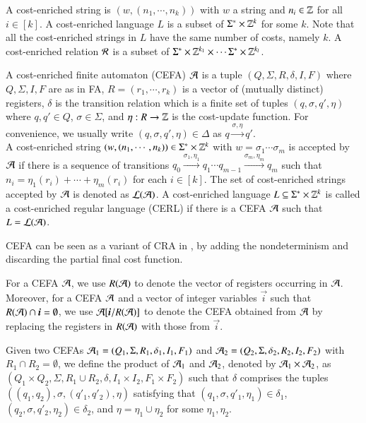 
A cost-enriched string is $(w, (n_1, \cdots, n_k))$ with $w$  a string and $n_i \in \mathbb{Z}$ for all $i \in [k]$. 
A cost-enriched language $L$ is a subset of $\Sigma^* \times \mathbb{Z}^k$ for some $k$. Note that all the cost-enriched strings in $L$ have the same number of costs, namely $k$.
A cost-enriched relation $\mathcal{R}$ is a subset of $\Sigma^* \times \mathbb{Z}^{k_1} \times \cdots \Sigma^* \times \mathbb{Z}^{k_l}$.

\begin{definition}
A cost-enriched finite automaton (CEFA) $\mathcal{A}$ is a tuple $(Q, \Sigma, R, \delta, I, F)$ where $Q, \Sigma, I, F$ are as in FA, $R=(r_1, \cdots, r_k)$ is a vector of (mutually distinct) registers, $\delta$ is the transition relation which is a finite set of tuples $(q, \sigma, q', \eta)$ where $q, q' \in Q$, $\sigma \in \Sigma$, and $\eta: R \rightarrow \mathbb{Z}$ is the cost-update function. For convenience, we usually write $(q, \sigma, q', \eta) \in \Delta$ as $q \xrightarrow{\sigma, \eta} q'$.
\\
A cost-enriched string $(w, (n_1, \cdots,n_k)) \in \Sigma^* \times \mathbb{Z}^k$ with $w=\sigma_1 \cdots \sigma_m$ is accepted by $\mathcal{A}$ if there is a sequence of transitions $q_0 \xrightarrow{\sigma_1, \eta_1} q_1 \cdots q_{m-1} \xrightarrow{\sigma_m, \eta_m} q_m$ such that $n_i = \eta_1(r_i) + \cdots + \eta_m(r_i)$ for each $i \in [k]$. The set of cost-enriched strings accepted by $\mathcal{A}$ is denoted as $\mathcal{L}(\mathcal{A})$. A cost-enriched language $L \subseteq \Sigma^* \times \mathbb{Z}^k$ is called a cost-enriched regular language (CERL) if there is a CEFA $\mathcal{A}$ such that $L = \mathcal{L}(\mathcal{A})$.
\end{definition}
CEFA can be seen as a variant of CRA in \cite{RLJ+13}, by adding the nondeterminism and discarding the partial final cost function. 

For a CEFA $\mathcal{A}$, we use $R(\mathcal{A})$ to denote the vector of registers occurring in $\mathcal{A}$. Moreover, for a CEFA $\mathcal{A}$ and a vector of integer variables $\vec{i}$ such that $R(\Aut) \cap \vec{i} = \emptyset$, we use $\Aut[\vec{i}/R(\Aut)]$ to denote the CEFA obtained from $\mathcal{A}$ by replacing the registers in $R(\mathcal{A})$ with those from $\vec{i}$. 


Given two CEFAs $\mathcal{A}_1 = ( Q_1, \Sigma, R_1, \delta_1, I_1, F_1)$ and $\mathcal{A}_2 = (Q_2, \Sigma, \delta_2, R_2, I_2, F_2)$ with $R_1 \cap R_2 = \emptyset$, we define the product of $\mathcal{A}_1$ and $\mathcal{A}_2$, denoted by $\mathcal{A}_1 \times \mathcal{A}_2$, as $(Q_1 \times Q_2, \Sigma, R_1 \cup R_2, \delta, I_1 \times I_2, F_1 \times F_2)$ such that $\delta$ comprises the tuples $((q_1, q_2), \sigma, (q'_1, q'_2), \eta)$ satisfying that $(q_1, \sigma, q'_1, \eta_1) \in \delta_1$, $(q_2, \sigma, q'_2, \eta_2) \in \delta_2$, and $\eta = \eta_1\cup \eta_2$ for some $\eta_1, \eta_2$.

